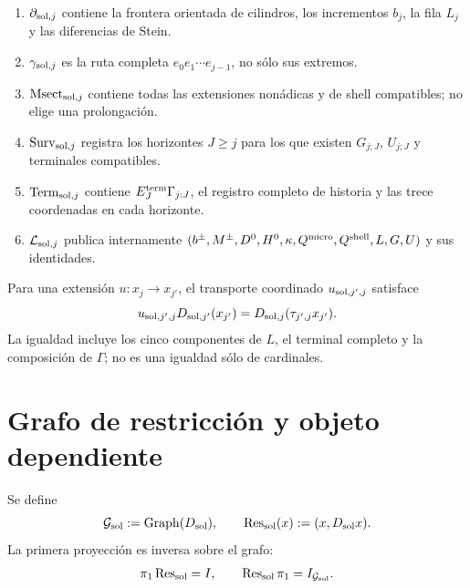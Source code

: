 \begin{enumerate}
 \item \(\partial_{{\rm sol},j}\) contiene la frontera orientada de cilindros,
       los incrementos \(b_j\), la fila \(L_j\) y las diferencias de Stein.
 \item \(\gamma_{{\rm sol},j}\) es la ruta completa
       \(e_0e_1\cdots e_{j-1}\), no sólo sus extremos.
 \item \(\operatorname{Msect}_{{\rm sol},j}\) contiene todas las extensiones
       nonádicas y de shell compatibles; no elige una prolongación.
 \item \(\operatorname{Surv}_{{\rm sol},j}\) registra los horizontes
       \(J\geq j\) para los que existen \(G_{j;J}\), \(U_{j;J}\) y
       terminales compatibles.
 \item \(\operatorname{Term}_{{\rm sol},j}\) contiene
       \(E_J^{\rm term}\Gamma_{j:J}\), el registro completo de historia y
       las trece coordenadas en cada horizonte.
 \item \(\mathcal L_{{\rm sol},j}\) publica internamente
       \((b^\pm,M^\pm,D^0,H^0,\kappa,Q^{\rm micro},Q^{\rm shell},
       L,G,U)\) y sus identidades.
\end{enumerate}

Para una extensión \(u:x_j\to x_{j'}\), el transporte coordinado
\(u_{{\rm sol},j',j}\) satisface
\begin{equation}\label{eq:pdfv2-sol-naturality-d}
 u_{{\rm sol},j',j}D_{{\rm sol},j'}(x_{j'})
 =D_{{\rm sol},j}(\tau_{j',j}x_{j'}).
\end{equation}
La igualdad incluye los cinco componentes de \(L\), el terminal completo y
la composición de \(\Gamma\); no es una igualdad sólo de cardinales.

\section{Grafo de restricción y objeto dependiente}
\label{sec:pdfv2-sol-graphs}

Se define
\begin{equation}\label{eq:pdfv2-sol-g-graph}
 \mathcal G_{\rm sol}:=\operatorname{Graph}(D_{\rm sol}),
 \qquad
 \operatorname{Res}_{\rm sol}(x):=(x,D_{\rm sol}x).
\end{equation}
La primera proyección es inversa sobre el grafo:
\begin{equation}\label{eq:pdfv2-sol-res-inverse}
 \pi_1\operatorname{Res}_{\rm sol}=I,
 \qquad
 \operatorname{Res}_{\rm sol}\pi_1=I_{\mathcal G_{\rm sol}}.
\end{equation}

